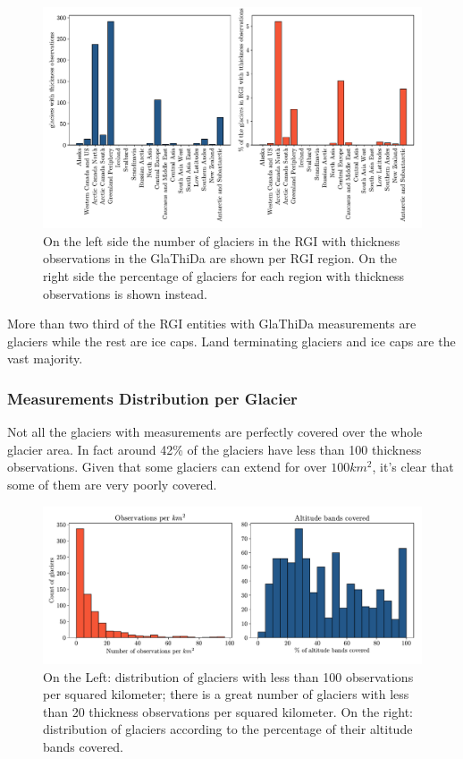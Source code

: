 \begin{figure}[!tp]
	\centering		  
	\includegraphics[width=1.\textwidth]{figures/Observations_per_region.pdf}
	\caption{On the left side the number of glaciers in the RGI with thickness observations in the GlaThiDa are shown per RGI region. On the right side the percentage of glaciers for each region with thickness observations is shown instead.}
	\label{fig:glareg}
\end{figure}

More than two third of the RGI entities with GlaThiDa measurements are glaciers while the rest are ice caps. Land terminating glaciers and ice caps are the vast majority.

\subsubsection{Measurements Distribution per Glacier}
Not all the glaciers with measurements are perfectly covered over the whole glacier area. In fact around 42\% of the glaciers have less than 100 thickness observations. Given that some glaciers can extend for over $100 km^2$, it’s clear that some of them are very poorly covered.
\begin{figure}[!tp]
	\centering		  
	\includegraphics[width=1.\textwidth]{figures/Observations_per_skm.pdf}
	\caption{On the Left: distribution of glaciers with less than 100 observations per squared kilometer; there is a great number of glaciers with less than 20 thickness observations per squared kilometer. On the right: distribution of glaciers according to the percentage of their altitude bands covered.}
	\label{fig:glaobs}
\end{figure}

